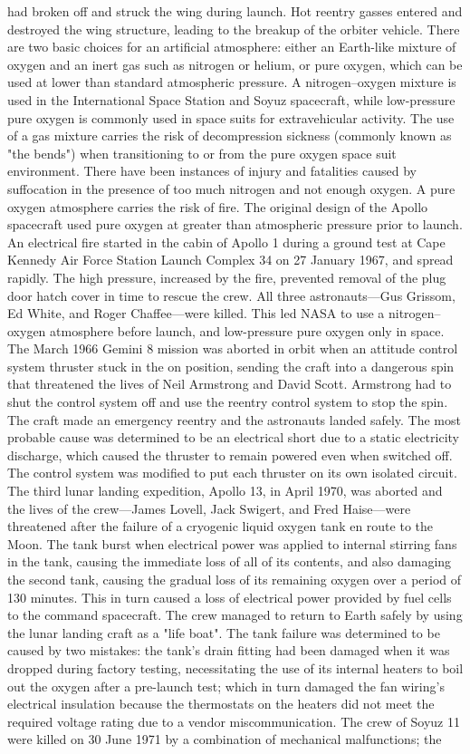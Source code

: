 \documentclass[12pt]{article}
\begin{document}
had broken off and struck the wing during launch. Hot reentry gasses entered and destroyed the wing structure, leading to the breakup of the orbiter vehicle. There are two basic choices for an artificial atmosphere: either an Earth-like mixture of oxygen and an inert gas such as nitrogen or helium, or pure oxygen, which can be used at lower than standard atmospheric pressure. A nitrogen–oxygen mixture is used in the International Space Station and Soyuz spacecraft, while low-pressure pure oxygen is commonly used in space suits for extravehicular activity. The use of a gas mixture carries the risk of decompression sickness (commonly known as "the bends") when transitioning to or from the pure oxygen space suit environment. There have been instances of injury and fatalities caused by suffocation in the presence of too much nitrogen and not enough oxygen. A pure oxygen atmosphere carries the risk of fire. The original design of the Apollo spacecraft used pure oxygen at greater than atmospheric pressure prior to launch. An electrical fire started in the cabin of Apollo 1 during a ground test at Cape Kennedy Air Force Station Launch Complex 34 on 27 January 1967, and spread rapidly. The high pressure, increased by the fire, prevented removal of the plug door hatch cover in time to rescue the crew. All three astronauts—Gus Grissom, Ed White, and Roger Chaffee—were killed. This led NASA to use a nitrogen–oxygen atmosphere before launch, and low-pressure pure oxygen only in space. The March 1966 Gemini 8 mission was aborted in orbit when an attitude control system thruster stuck in the on position, sending the craft into a dangerous spin that threatened the lives of Neil Armstrong and David Scott. Armstrong had to shut the control system off and use the reentry control system to stop the spin. The craft made an emergency reentry and the astronauts landed safely. The most probable cause was determined to be an electrical short due to a static electricity discharge, which caused the thruster to remain powered even when switched off. The control system was modified to put each thruster on its own isolated circuit. The third lunar landing expedition, Apollo 13, in April 1970, was aborted and the lives of the crew—James Lovell, Jack Swigert, and Fred Haise—were threatened after the failure of a cryogenic liquid oxygen tank en route to the Moon. The tank burst when electrical power was applied to internal stirring fans in the tank, causing the immediate loss of all of its contents, and also damaging the second tank, causing the gradual loss of its remaining oxygen over a period of 130 minutes. This in turn caused a loss of electrical power provided by fuel cells to the command spacecraft. The crew managed to return to Earth safely by using the lunar landing craft as a "life boat". The tank failure was determined to be caused by two mistakes: the tank's drain fitting had been damaged when it was dropped during factory testing, necessitating the use of its internal heaters to boil out the oxygen after a pre-launch test; which in turn damaged the fan wiring's electrical insulation because the thermostats on the heaters did not meet the required voltage rating due to a vendor miscommunication. The crew of Soyuz 11 were killed on 30 June 1971 by a combination of mechanical malfunctions; the 
\end{document}
